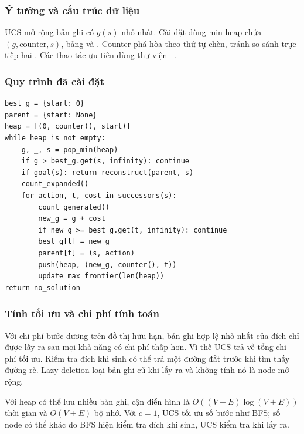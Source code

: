 \documentclass[a4paper]{article}
\newcommand{\tep}[1]{{\small\ttfamily\detokenize{#1}}}
\begin{document}
\subsubsection{Ý tưởng và cấu trúc dữ liệu}
UCS mở rộng bản ghi có $g(s)$ nhỏ nhất. Cài đặt dùng min-heap chứa $(g,\mathrm{counter},s)$, bảng \tep{best_g} và \tep{parent}. Counter phá hòa theo thứ tự chèn, tránh so sánh trực tiếp hai \tep{State}. Các thao tác ưu tiên dùng thư viện \tep{heapq}~\cite{heapq}.

\subsubsection{Quy trình đã cài đặt}
\par\noindent\begin{minipage}{\textwidth}
\begin{lstlisting}[caption={UCS: bỏ bản ghi cũ, chỉ nhận đích khi lấy ra.}]
best_g = {start: 0}
parent = {start: None}
heap = [(0, counter(), start)]
while heap is not empty:
    g, _, s = pop_min(heap)
    if g > best_g.get(s, infinity): continue
    if goal(s): return reconstruct(parent, s)
    count_expanded()
    for action, t, cost in successors(s):
        count_generated()
        new_g = g + cost
        if new_g >= best_g.get(t, infinity): continue
        best_g[t] = new_g
        parent[t] = (s, action)
        push(heap, (new_g, counter(), t))
        update_max_frontier(len(heap))
return no_solution
\end{lstlisting}
\end{minipage}\par\medskip

\subsubsection{Tính tối ưu và chi phí tính toán}
Với chi phí bước dương trên đồ thị hữu hạn, bản ghi hợp lệ nhỏ nhất của đích chỉ được lấy ra sau mọi khả năng có chi phí thấp hơn. Vì thế UCS trả về tổng chi phí tối ưu. Kiểm tra đích khi sinh có thể trả một đường đắt trước khi tìm thấy đường rẻ. Lazy deletion loại bản ghi cũ khi lấy ra và không tính nó là node mở rộng.

Với heap có thể lưu nhiều bản ghi, cận điển hình là $O((V+E)\log(V+E))$ thời gian và $O(V+E)$ bộ nhớ. Với $c=1$, UCS tối ưu số bước như BFS; số node có thể khác do BFS hiện kiểm tra đích khi sinh, UCS kiểm tra khi lấy ra.



\end{document}
